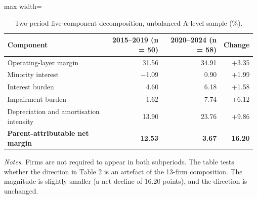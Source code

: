 \documentclass[review,3p,times]{elsarticle}
\begin{document}
\begin{table}[!htbp]
\centering
\renewcommand{\thetable}{A2}
\caption{Two-period five-component decomposition, unbalanced A-level sample (\%).}\label{tab:A2}
\begin{minipage}{\textwidth}
\centering
\footnotesize
\begin{adjustbox}{max width=\textwidth}
\begin{tabular}{@{}lrrr@{}}
\toprule
Component & 2015--2019 (n = 50) & 2020--2024 (n = 58) & Change \\
\midrule
Operating-layer margin & 31.56 & 34.91 & +3.35 \\
Minority interest & \ensuremath{-}1.09 & 0.90 & +1.99 \\
Interest burden & 4.60 & 6.18 & +1.58 \\
Impairment burden & 1.62 & 7.74 & +6.12 \\
Depreciation and amortisation intensity & 13.90 & 23.76 & +9.86 \\
\textbf{Parent-attributable net margin} & \textbf{12.53} & \textbf{\ensuremath{-}3.67} & \textbf{\ensuremath{-}16.20} \\
\bottomrule
\end{tabular}
\end{adjustbox}
\par\medskip
\raggedright
\noindent\textit{Notes.} Firms are not required to appear in both subperiods. The table tests whether the direction in Table 2 is an artefact of the 13-firm composition. The magnitude is slightly smaller (a net decline of 16.20 points), and the direction is unchanged.
\end{minipage}
\end{table}
\end{document}
